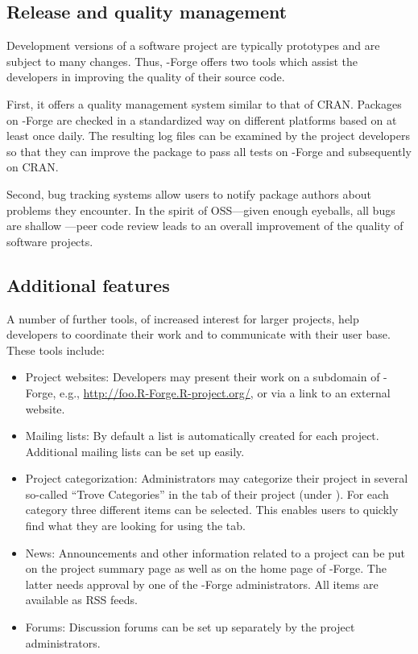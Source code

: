 \subsection{Release and quality management}
\label{sec:release_and_quality_management}

Development versions of a software project are typically
prototypes and are subject to many changes. Thus, \R{}-Forge offers
two tools which assist the developers in improving the quality of
their source code.

First, it offers a quality management system similar to
that of CRAN. Packages on \R{}-Forge are checked in a
standardized way on different platforms based on
 at least once daily. The resulting log files can be
examined by the project developers so that they can improve
the package to pass all tests on \R{}-Forge and subsequently on CRAN.

Second, bug tracking systems allow users to notify
package authors about problems they encounter. In the spirit of
OSS---given enough eyeballs, all bugs are shallow
\citep{forge:Raymond:1999}---peer code review leads to an
overall improvement of the quality of software projects.

\subsection{Additional features}

A number of further tools, of increased interest for larger
projects, help developers to coordinate their work and to communicate
with their user base. These tools include:

\begin{itemize}
\item Project websites: Developers may present their work
  on a subdomain of \R{}-Forge, e.g.,
  \url{http://foo.R-Forge.R-project.org/}, or via a link to an
  external website.
\item Mailing lists: By default a list
   is automatically
  created for each project. Additional mailing lists can be
  set up easily.
\item Project categorization: Administrators may categorize their
  project in several so-called ``Trove Categories'' in the 
  tab of their project (under ). For each
  category three different items can be selected. This enables users
  to quickly find what they are looking for using the 
  tab.
\item News: Announcements and other information related to a project
  can be put on the project summary page as well as on the
  home page of \R{}-Forge. The latter needs approval by one of the \R{}-Forge
  administrators. All items are available as RSS feeds.
\item Forums: Discussion forums can be set up separately by the
  project administrators.%
\end{itemize}

